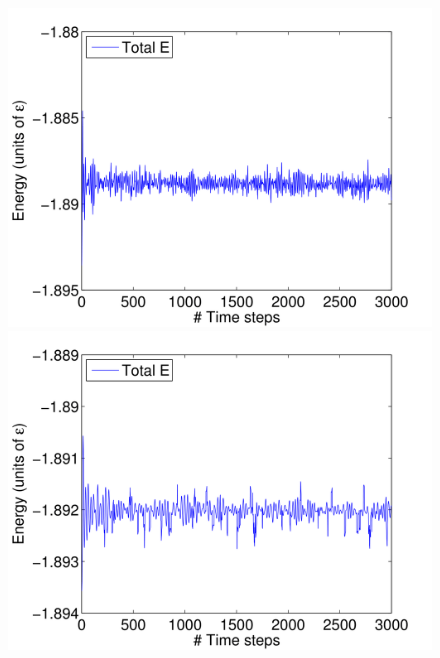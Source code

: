 \documentclass[12pt, oneside]{article}
\begin{document}
\begin{figure}
\begin{minipage}[!htbp]{.5\linewidth}
\includegraphics[width=\textwidth]{./figs/ex5-dt=004.png}
\subcaption{}
\end{minipage}
\hspace{0.02\linewidth}
\begin{minipage}[!htbp]{.5\linewidth}
\includegraphics[width=\textwidth]{./figs/ex5-dt=002.png}
\subcaption{}
\end{minipage}
\hspace{0.02\linewidth}
\begin{minipage}[!htbp]{.5\linewidth}

\end{minipage}
\end{figure}
\end{document}

